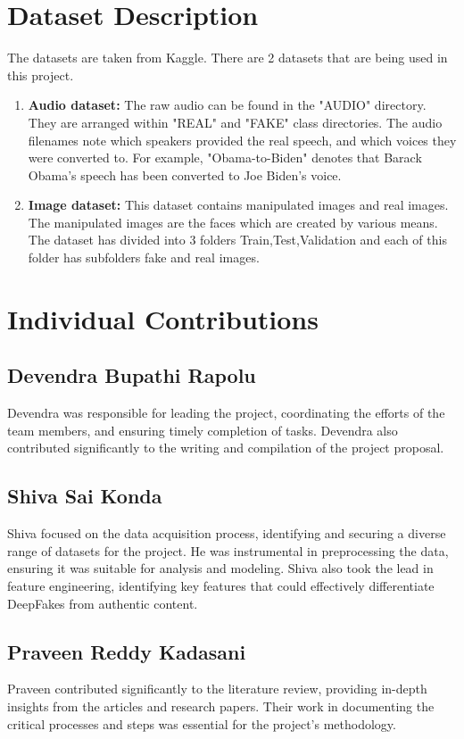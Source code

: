 \documentclass[12pt]{extarticle}
\begin{document}
\section{Dataset Description}
The datasets are taken from Kaggle.
There are 2 datasets that are being used in this project.
\begin{enumerate}
    \item \textbf{Audio dataset:}
The raw audio can be found in the "AUDIO" directory. They are arranged within "REAL" and "FAKE" class directories. The audio filenames note which speakers provided the real speech, and which voices they were converted to. For example, "Obama-to-Biden" denotes that Barack Obama's speech has been converted to Joe Biden's voice.\cite{kaggleDeepVoice}

\item \textbf{Image dataset:}
This dataset contains manipulated images and real images. The manipulated images are the faces which are created by various means. The dataset has divided into 3 folders Train,Test,Validation and each of this folder has subfolders fake and real images.\cite{kaggleDeepImages}
\end{enumerate}
\section{Individual Contributions}

\subsection{Devendra Bupathi Rapolu}
Devendra was responsible for leading the project, coordinating the efforts of the team members, and ensuring timely completion of tasks. Devendra also contributed significantly to the writing and compilation of the project proposal.
\subsection{Shiva Sai Konda}
Shiva focused on the data acquisition process, identifying and securing a diverse range of datasets for the project. He was instrumental in preprocessing the data, ensuring it was suitable for analysis and modeling. Shiva also took the lead in feature engineering, identifying key features that could effectively differentiate DeepFakes from authentic content.
\subsection{Praveen Reddy Kadasani}
Praveen contributed significantly to the literature review, providing in-depth insights from the articles and research papers. Their work in documenting the critical processes and steps was essential for the project's methodology.
\end{document}
